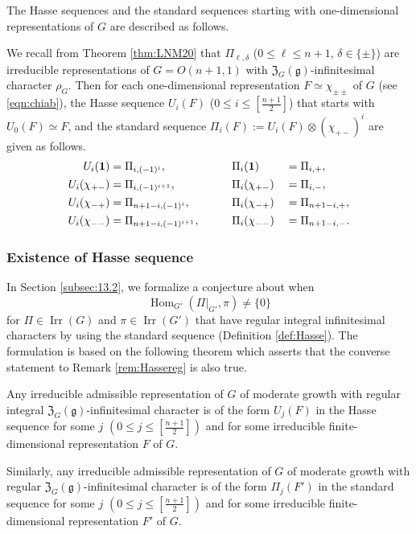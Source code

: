 The Hasse sequences and the standard sequences starting 
 with one-dimensional representations of $G$
 are described as follows.  
\begin{example}
\label{ex:171455}
We recall from Theorem \ref{thm:LNM20}
 that 
$\Pi_{\ell, \delta}$
 ($0 \le \ell \le n+1$, $\delta \in \{\pm\}$)
 are irreducible representations
 of $G=O(n+1,1)$
 with ${\mathfrak{Z}}_G({\mathfrak{g}})$-infinitesimal character 
 $\rho_G$.  
Then for each one-dimensional representation
 $F \simeq \chi_{\pm\pm}$ of $G$
 (see \eqref{eqn:chiab}), 
 the Hasse sequence
 $U_i(F)$ ($0 \le i \le [\frac{n+1}{2}]$) 
 that starts with $U_0(F) \simeq F$, 
 and the standard sequence $\Pi_i(F):=U_i(F) \otimes (\chi_{+-})^i$
 are given as follows.  
\begin{alignat*}{3}
U_i({\bf{1}})&=\Pi_{i,(-1)^i},
&&
\Pi_i({\bf{1}})&&=\Pi_{i,+},
\\
U_i(\chi_{+-})&=\Pi_{i,(-1)^{i+1}},
&&
\Pi_i(\chi_{+-})&&=\Pi_{i,-},
\\
U_i(\chi_{-+})&=\Pi_{n+1-i,(-1)^{i}},
&&
\Pi_i(\chi_{-+})&&=\Pi_{n+1-i,+},
\\
U_i(\chi_{--})&=\Pi_{n+1-i,(-1)^{i+1}}, 
\qquad
&&
\Pi_i(\chi_{--})&&=\Pi_{n+1-i,-}.  
\end{alignat*}
\end{example}


\subsubsection{Existence of Hasse sequence}

In Section \ref{subsec:13.2}, 
 we formalize a conjecture
 about when 
\[
  \operatorname{Hom}_{G'}(\Pi|_{G'}, \pi ) \ne \{0\}
\]
for $\Pi \in \operatorname{Irr} (G)$
 and $\pi \in \operatorname{Irr} (G')$
 that have regular integral infinitesimal characters
 by using the standard sequence
 (Definition \ref{def:Hasse}).  
The formulation is based on the following theorem
 which asserts 
 that the converse statement to Remark \ref{rem:Hassereg}
 is also true.  

\begin{theorem}
\label{thm:Hassereg}
Any irreducible admissible representation of $G$
 of moderate growth
 with regular integral ${\mathfrak{Z}}_G({\mathfrak{g}})$-infinitesimal character is of the form 
 $U_j(F)$
 in the Hasse sequence
 for some $j$ $(0 \le j \le [\frac{n+1}{2}])$
 and for some irreducible finite-dimensional representation $F$ of $G$.  



Similarly,
 any irreducible admissible representation of $G$
 of moderate growth 
 with regular ${\mathfrak{Z}}_G({\mathfrak{g}})$-infinitesimal character
 is of the form $\Pi_j(F')$
 in the standard sequence
 for some $j$ $(0 \le j \le [\frac{n+1}{2}])$
 and for some irreducible finite-dimensional representation $F'$ of $G$.  
\end{theorem}

